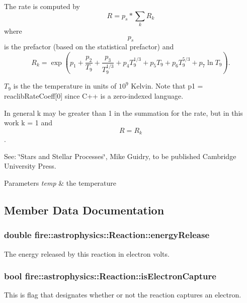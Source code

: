 The rate is computed by \[ R = p_s*\sum_k R_k \] where \[p_s\] is the prefactor (based on the statistical prefactor) and \[ R_k = \exp(p_1 + \frac{p_2}{T_9} + \frac{p_3}{T_9^{1/3}} + p_{4}T_9^{1/3} + p_{5}T_9 + p_{6}T_9^{5/3} + p_{7}\ln T_9). \]

$T_9$ is the the temperature in units of $10^9$ Kelvin. Note that p1 = reaclib\+Rate\+Coeff\mbox{[}0\mbox{]} since C++ is a zero-\/indexed language.

In general k may be greater than 1 in the summation for the rate, but in this work k = 1 and \[R = R_k\].

See\+: \char`\"{}\+Stars and Stellar Processes\char`\"{}, Mike Guidry, to be published Cambridge University Press.


\begin{DoxyParams}{Parameters}
{\em temp} & the temperature \\
\hline
\end{DoxyParams}


\subsection{Member Data Documentation}
\subsubsection[{\texorpdfstring{energy\+Release}{energyRelease}}]{\setlength{\rightskip}{0pt plus 5cm}double fire\+::astrophysics\+::\+Reaction\+::energy\+Release}\hypertarget{a00242_a07f4db35c5d9bca2d5c5fc8529ec3801}{}\label{a00242_a07f4db35c5d9bca2d5c5fc8529ec3801}
The energy released by this reaction in electron volts. 
\subsubsection[{\texorpdfstring{is\+Electron\+Capture}{isElectronCapture}}]{\setlength{\rightskip}{0pt plus 5cm}bool fire\+::astrophysics\+::\+Reaction\+::is\+Electron\+Capture}\hypertarget{a00242_a84165249a444a64bdfc41531fbe81cc0}{}\label{a00242_a84165249a444a64bdfc41531fbe81cc0}
This is flag that designates whether or not the reaction captures an electron. 
